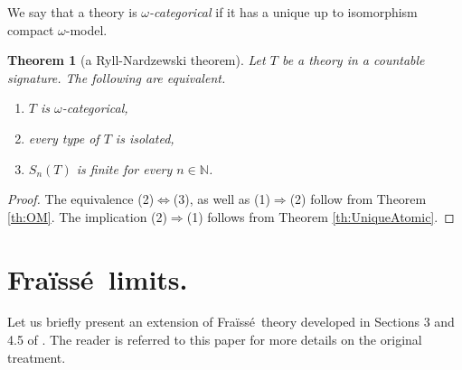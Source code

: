 \documentclass[12pt]{amsart}
\theoremstyle{plain}
\newtheorem{theorem}{Theorem}[section]
\newtheorem{corollary}[theorem]{\bf Corollary}
\newcommand \fra{Fra\"{i}ss\'{e}}
\newcommand \NN{\mathbb{N}}
\begin{document}
	
	
We say that a theory is \emph{$\omega$-categorical} if it has a unique up to isomorphism compact $\omega$-model.

\begin{theorem}[a Ryll-Nardzewski theorem]
		Let $T$ be a theory in a countable signature. The following are equivalent.
		
		\begin{enumerate}
			\item $T$ is  $\omega$-categorical,
			\item every type of $T$ is isolated,
			\item $S_n(T)$ is finite for every $n \in \NN$.
		\end{enumerate}
	\end{theorem}
	
	\begin{proof}
		The equivalence (2)$\Leftrightarrow$(3), as well as (1)$\Rightarrow$(2) follow from Theorem \ref{th:OM}. The implication (2)$\Rightarrow$(1) follows from Theorem \ref{th:UniqueAtomic}.
	\end{proof}
	
\section{\fra \  limits.}

Let us briefly present an extension of  \fra  \ theory developed in Sections 3 and 4.5 of \cite{BaBiVi2}. The reader is referred to this paper for more details on the original treatment.
\end{document}
